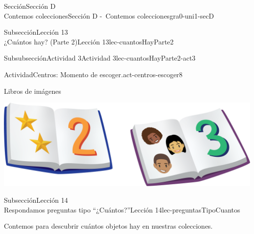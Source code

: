 \begin{sectionptx}{Sección}{{\Large Sección D\\}Contemos colecciones}{}{Sección D -~Contemos colecciones}{}{}{gra0-uni1-secD}
\begin{subsectionptx}{Subsección}{{\normalsize Lección 13\\[-0.05cm]}¿Cuántos hay? (Parte 2)}{}{Lección 13}{}{}{lec-cuantosHayParte2}
\begin{subsubsectionptx}{Subsubsección}{Actividad 3}{}{Actividad 3}{}{}{lec-cuantosHayParte2-act3}
\begin{activity}{Actividad}{Centros: Momento de escoger.}{act-centros-escoger8}
\begin{sidebyside}{2}{0.025}{0.025}{0.05}
\begin{sbspanel}{0.45}
\end{sbspanel}%
\begin{sbspanel}{0.45}%
Libros de imágenes%
\par
\includegraphics[max width=\linewidth, center]{external/png-source/K.1.D Beta Student Workbooks.Books.png}
\end{sbspanel}%
\end{sidebyside}%
\end{activity}%
\end{subsubsectionptx}
\end{subsectionptx}
%
%
\typeout{************************************************}
\typeout{************************************************}
%
\begin{subsectionptx}{Subsección}{{\normalsize Lección 14\\[-0.05cm]}Respondamos preguntas tipo “¿Cuántos?”}{}{Lección 14}{}{}{lec-preguntasTipoCuantos}
\begin{introduction}{}%
Contemos para descubrir cuántos objetos hay en nuestras colecciones. 
\end{introduction}%
%
%
\typeout{************************************************}
\typeout{************************************************}
%
%
%
\typeout{************************************************}
\typeout{************************************************}

\end{subsectionptx}
\end{sectionptx}
